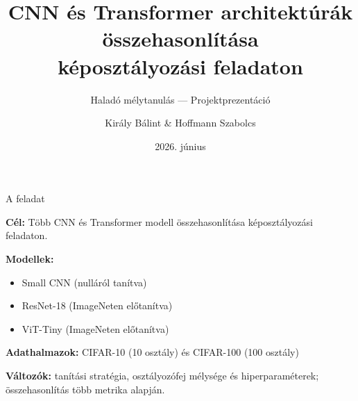 \documentclass{beamer}
\title[CNN vs.\ Transformer]{CNN és Transformer architektúrák összehasonlítása\\képosztályozási feladaton}
\subtitle{Haladó mélytanulás --- Projektprezentáció}
\author[B.~Kir\'{a}ly \& Sz.~Hoffmann]{Kir\'{a}ly B\'{a}lint \& Hoffmann Szabolcs}
\institute{E\"{o}tv\"{o}s Lor\'{a}nd Tudom\'{a}nyegyetem}
\date{2026. június}
\begin{document}
\begin{frame}
  \titlepage
\end{frame}

\begin{frame}{A feladat}

  \textbf{Cél:} Több CNN és Transformer modell összehasonlítása képosztályozási feladaton.

  \bigskip
  \textbf{Modellek:}
  \begin{itemize}
    \item Small CNN (nulláról tanítva)
    \item ResNet-18 (ImageNeten előtanítva)
    \item ViT-Tiny (ImageNeten előtanítva)
  \end{itemize}

  \bigskip
  \textbf{Adathalmazok:} CIFAR-10 (10 osztály) és CIFAR-100 (100 osztály)

  \bigskip
  \textbf{Változók:} tanítási stratégia, osztályozófej mélysége és hiperparaméterek;
  összehasonlítás több metrika alapján.


\end{frame}
\end{document}
